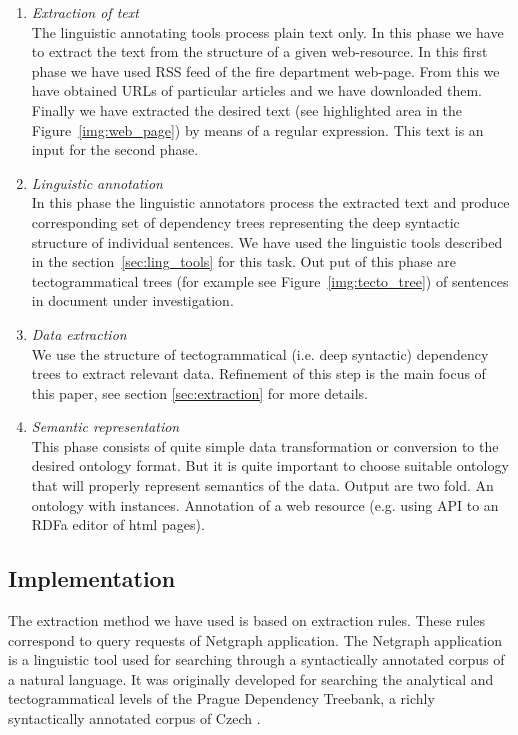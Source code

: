 \begin{enumerate}
\item \emph{Extraction of text} \\ The linguistic annotating tools process plain text only. In this phase we have to extract the text from the structure of a given web-resource. In this first phase we have used RSS feed of the fire department web-page. From this we have obtained URLs of particular articles and we have downloaded them. Finally we have extracted the desired text (see highlighted area in the Figure~\ref{img:web_page}) by means of a regular expression. This text is an input for the second phase.

\item \emph{Linguistic annotation} \\ In this phase the linguistic annotators process the extracted text and produce corresponding set of dependency trees representing the deep syntactic structure of individual sentences. We have used the linguistic tools described in the section~\ref{sec:ling_tools} for this task. Out put of this phase are tectogrammatical trees (for example see Figure~\ref{img:tecto_tree}) of sentences in document under investigation.

\item \emph{Data extraction} \\ We use the structure of tectogrammatical (i.e. deep syntactic) dependency trees to extract relevant data. Refinement of this step is the main focus of this paper, see section \ref{sec:extraction} for more details.

\item \emph{Semantic representation} \\ This phase consists of quite simple data transformation or conversion to the desired ontology format. But it is quite important to choose suitable ontology that will properly represent semantics of the data. Output are two fold. An ontology with instances. Annotation of a web resource (e.g. using API to an RDFa editor of html pages).

\end{enumerate}



\subsection{Implementation}
The extraction method we have used is based on extraction rules. These rules correspond to query requests of Netgraph application. The Netgraph application \citep{biblio:MiNetgraphA2006} is a linguistic tool used for searching through a syntactically annotated corpus of a natural language. It was originally developed for searching the analytical and tectogrammatical levels of the Prague Dependency Treebank, a richly syntactically annotated corpus of Czech \citep{biblio:PDT20_CD}.

